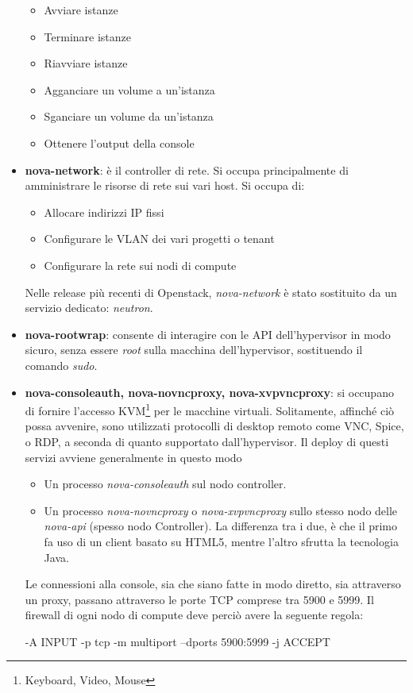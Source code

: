 \begin{itemize}
\begin{itemize}
\item Avviare istanze
\item Terminare istanze
\item Riavviare istanze
\item Agganciare un volume a un'istanza
\item Sganciare un volume da un'istanza
\item Ottenere l'output della console
\end{itemize}
\item \textbf{nova-network}: è il controller di rete. Si occupa principalmente di amministrare le risorse di rete sui vari host. Si occupa di:
\begin{itemize}
\item Allocare indirizzi IP fissi
\item Configurare le VLAN dei vari progetti o tenant
\item Configurare la rete sui nodi di compute
\end{itemize}
Nelle release più recenti di Openstack, \textit{nova-network} è stato sostituito da un servizio dedicato: \textit{neutron}.
\item \textbf{nova-rootwrap}: consente di interagire con le API dell'hypervisor in modo sicuro, senza essere \textit{root} sulla macchina dell'hypervisor, sostituendo il comando \textit{sudo}.
\item \textbf{nova-consoleauth, nova-novncproxy, nova-xvpvncproxy}: si occupano di fornire l'accesso KVM\footnote{Keyboard, Video, Mouse} per le macchine virtuali. Solitamente, affinché ciò possa avvenire, sono utilizzati protocolli di desktop remoto come VNC, Spice, o RDP, a seconda di quanto supportato dall'hypervisor.
Il deploy di questi servizi avviene generalmente in questo modo
\begin{itemize}
\item Un processo \textit{nova-consoleauth} sul nodo controller.
\item Un processo \textit{nova-novncproxy} o \textit{nova-xvpvncproxy} sullo stesso nodo delle \textit{nova-api} (spesso nodo Controller). La differenza tra i due, è che il primo fa uso di un client basato su HTML5, mentre l'altro sfrutta la tecnologia Java. 
\end{itemize}
Le connessioni alla console, sia che siano fatte in modo diretto, sia attraverso un proxy, passano attraverso le porte TCP comprese tra 5900 e 5999. Il firewall di ogni nodo di compute deve perciò avere la seguente regola:
\begin{python}
-A INPUT -p tcp -m multiport --dports 5900:5999 -j ACCEPT
\end{python}
\end{itemize}

